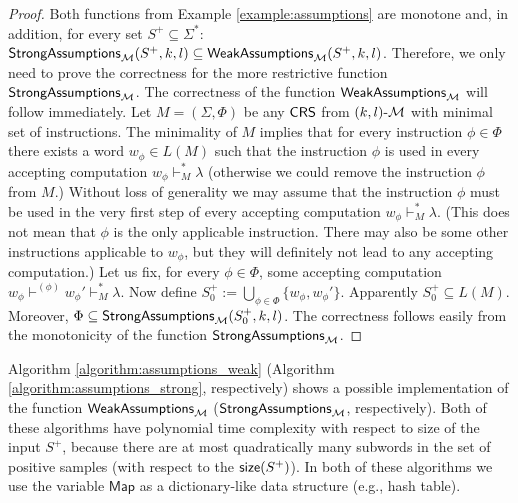 \begin{proof}
Both functions from Example \ref{example:assumptions} are monotone and, in addition, for every set $S^+ \subseteq \Sigma^*$: $\mathsf{StrongAssumptions}_{\textup{\sf $\mathcal{M}$}}(S^+,k,l) \subseteq \mathsf{WeakAssumptions}_{\textup{\sf $\mathcal{M}$}}(S^+,k,l)$. Therefore, we only need to prove the correctness for the more restrictive function $\mathsf{StrongAssumptions}_{\textup{\sf $\mathcal{M}$}}$. The correctness of the function $\mathsf{WeakAssumptions}_{\textup{\sf $\mathcal{M}$}}$ will follow immediately. Let $M = (\Sigma, \Phi)$ be any $\mbox{\sf CRS\/}$ from $\textup{\sf $(k,l)$-\textup{\sf $\mathcal{M}$}}$ with minimal set of instructions. The minimality of $M$ implies that for every instruction $\phi \in \Phi$ there exists a word $w_{\phi} \in L(M)$ such that the instruction $\phi$ is used in every accepting computation $w_{\phi} \vdash_M^* \lambda$ (otherwise we could remove the instruction $\phi$ from $M$.) Without loss of generality we may assume that the instruction $\phi$ must be used in the very first step of every accepting computation $w_{\phi} \vdash_M^* \lambda$. (This does not mean that $\phi$ is the only applicable instruction. There may also be some other instructions applicable to $w_{\phi}$, but they will definitely not lead to any accepting computation.) Let us fix, for every $\phi \in \Phi$, some accepting computation $w_{\phi} \vdash^{(\phi)} w_{\phi}' \vdash_M^* \lambda$. Now define $S_0^+ := \bigcup_{\phi \in \Phi} \{ w_{\phi}, w_{\phi}' \}$. Apparently $S_0^+ \subseteq L(M)$. Moreover, $\Phi \subseteq \mathsf{StrongAssumptions}_{\textup{\sf $\mathcal{M}$}}(S_0^+, k, l)$. The correctness follows easily from the monotonicity of the function $\mathsf{StrongAssumptions}_{\textup{\sf $\mathcal{M}$}}$.
\end{proof}

Algorithm \ref{algorithm:assumptions_weak} (Algorithm \ref{algorithm:assumptions_strong}, respectively) shows a possible implementation of the function $\mathsf{WeakAssumptions}_{\textup{\sf $\mathcal{M}$}}$ ($\mathsf{StrongAssumptions}_{\textup{\sf $\mathcal{M}$}}$, respectively). Both of these algorithms have polynomial time complexity with respect to size of the input $S^+$, because there are at most quadratically many subwords in the set of positive samples (with respect to the $\size(S^+)$). In both of these algorithms we use the variable $\mathsf{Map}$ as a dictionary-like data structure (e.g., hash table).

